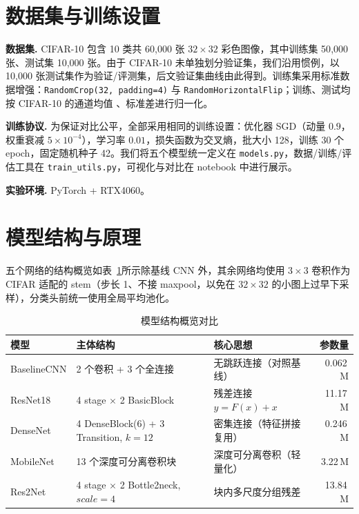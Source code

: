 \documentclass[a4paper]{article}
\begin{document}
\section{数据集与训练设置}
\textbf{数据集.} CIFAR-10 包含 10 类共 60{,}000 张 $32\times32$ 彩色图像，其中训练集 50{,}000 张、测试集 10{,}000 张。由于 CIFAR-10 未单独划分验证集，我们沿用惯例，以 10{,}000 张测试集作为验证/评测集，后文验证集曲线由此得到。训练集采用标准数据增强：\texttt{RandomCrop(32, padding=4)} 与 \texttt{RandomHorizontalFlip}；训练、测试均按 CIFAR-10 的通道均值 、标准差进行归一化。

\textbf{训练协议.} 为保证对比公平，全部采用相同的训练设置：优化器 SGD（动量 $0.9$，权重衰减 $5\times10^{-4}$），学习率 $0.01$，损失函数为交叉熵，批大小 128，训练 30 个 epoch，固定随机种子 42。我们将五个模型统一定义在 \texttt{models.py}，数据/训练/评估工具在 \texttt{train\_utils.py}，可视化与对比在 notebook 中进行展示。

\textbf{实验环境.} PyTorch + RTX4060。

\section{模型结构与原理}
五个网络的结构概览如表~\ref{tab:arch}所示除基线 CNN 外，其余网络均使用 $3\times3$ 卷积作为 CIFAR 适配的 stem（步长 1、不接 maxpool，以免在 $32\times32$ 的小图上过早下采样），分类头前统一使用全局平均池化。

\begin{table}[H]
  \centering
  \caption{模型结构概览对比}
  \label{tab:arch}
  \begin{tabular}{lllr}
    \toprule
    模型 & 主体结构 & 核心思想 & 参数量 \\
    \midrule
    BaselineCNN & 2 个卷积 + 3 个全连接 & 无跳跃连接（对照基线） & 0.062\,M \\
    ResNet18    & 4 stage $\times$ 2 BasicBlock & 残差连接 $y=F(x)+x$ & 11.17\,M \\
    DenseNet    & 4 DenseBlock(6) + 3 Transition, $k{=}12$ & 密集连接（特征拼接复用） & 0.246\,M \\
    MobileNet   & 13 个深度可分离卷积块 & 深度可分离卷积（轻量化） & 3.22\,M \\
    Res2Net     & 4 stage $\times$ 2 Bottle2neck, $scale{=}4$ & 块内多尺度分组残差 & 13.84\,M \\
    \bottomrule
  \end{tabular}
\end{table}
\end{document}
